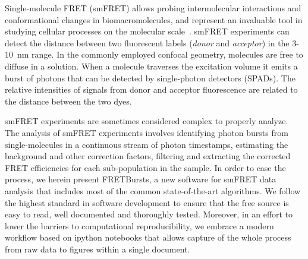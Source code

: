 Single-molecule FRET (smFRET) allows probing intermolecular interactions
and conformational changes in biomacromolecules, and represent an 
invaluable tool in studying cellular processes on the molecular 
scale~\cite{Kapanidis_2006}. smFRET experiments can detect the distance between 
two fluorescent labels (\textit{donor} and \textit{acceptor}) in the 
3-10~nm range. In the commonly employed confocal geometry, molecules are free 
to diffuse in a solution. When a molecule traverses the excitation volume it 
emits a burst of photons that can be detected by single-photon detectors (SPADs). 
The relative intensities of signals from donor and acceptor fluorescence 
are related to the distance between the two dyes.

smFRET experiments are sometimes considered complex to properly analyze. 
The analysis of smFRET experiments involves identifying photon bursts from 
single-molecules in a continuous stream of photon timestamps, estimating the 
background and other correction factors, filtering and extracting the corrected 
FRET efficiencies for each sub-population in the sample. In order to ease 
the process, we herein present FRETBursts, a new software for smFRET data 
analysis that includes most of the common state-of-the-art algorithms. 
We follow the highest standard in software development to ensure that 
the free source is easy to read, well documented and thoroughly tested. 
Moreover, in an effort to lower the barriers to computational reproducibility, 
we embrace a modern workflow based on ipython notebooks that allows capture 
of the whole process from raw data to figures within a single document.
